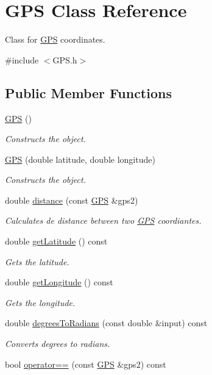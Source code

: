 \hypertarget{classGPS}{}\section{G\+PS Class Reference}
\label{classGPS}


Class for \hyperlink{classGPS}{G\+PS} coordinates.  




{\ttfamily \#include $<$G\+P\+S.\+h$>$}

\subsection*{Public Member Functions}
\begin{DoxyCompactItemize}
\item 
\hyperlink{classGPS_a0c347a188512d0d5cf7ed5c91b145fc4}{G\+PS} ()
\begin{DoxyCompactList}\small\item\em Constructs the object. \end{DoxyCompactList}\item 
\hyperlink{classGPS_aef8b0d02153efdf5dc94f3249e79c913}{G\+PS} (double latitude, double longitude)
\begin{DoxyCompactList}\small\item\em Constructs the object. \end{DoxyCompactList}\item 
double \hyperlink{classGPS_ae4ef07b40563fc8e3eff42663b23e4a6}{distance} (const \hyperlink{classGPS}{G\+PS} \&gps2)
\begin{DoxyCompactList}\small\item\em Calculates de distance between two \hyperlink{classGPS}{G\+PS} coordiantes. \end{DoxyCompactList}\item 
double \hyperlink{classGPS_a3838be0e132205e5964d62feff22a942}{get\+Latitude} () const 
\begin{DoxyCompactList}\small\item\em Gets the latitude. \end{DoxyCompactList}\item 
double \hyperlink{classGPS_a38f262c800ff15583b0f1a5e52cd8a95}{get\+Longitude} () const 
\begin{DoxyCompactList}\small\item\em Gets the longitude. \end{DoxyCompactList}\item 
double \hyperlink{classGPS_a4c0a2af15fb71993b8d801a1853d7f59}{degrees\+To\+Radians} (const double \&input) const 
\begin{DoxyCompactList}\small\item\em Converts degrees to radians. \end{DoxyCompactList}\item 
bool \hyperlink{classGPS_ad7a5cffbd374de2261eabd949a7f99d6}{operator==} (const \hyperlink{classGPS}{G\+PS} \&gps2) const 
\end{DoxyCompactItemize}


